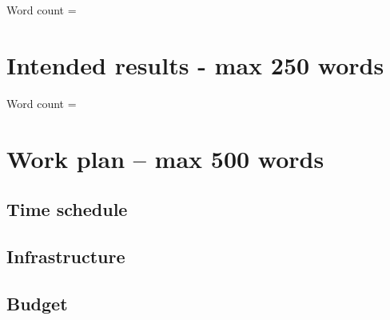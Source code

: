 \documentclass[12pt,a4paper]{article}
\begin{document}
Word count =

\section{Intended results \textmd{- max 250 words}}





Word count = 

\section{Work plan \textmd{– max 500 words}}

\subsection{Time schedule}

\subsection{Infrastructure}

\subsection{Budget}
\end{document}
